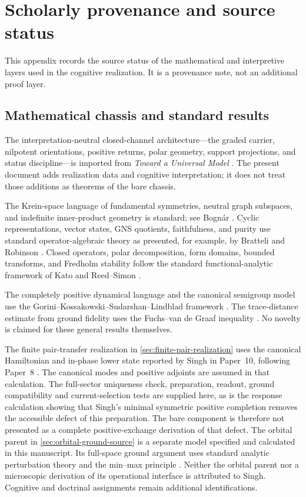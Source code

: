 \documentclass[11pt,reqno]{scrartcl}
\theoremstyle{plain}
\theoremstyle{definition}
\theoremstyle{remark}
\begin{document}
\section{Scholarly provenance and source status}
\label{app:provenance}

This appendix records the source status of the mathematical and interpretive
layers used in the cognitive realization.  It is a provenance note, not an
additional proof layer.

\subsection{Mathematical chassis and standard results}

The interpretation-neutral closed-channel architecture---the graded carrier,
nilpotent orientations, positive returns, polar geometry, support
projections, and status discipline---is imported from \emph{Toward a
Universal Model} \cite{TAUM2026}.  The present document adds realization data
and cognitive interpretation; it does not treat those additions as theorems of
the bare chassis.

The Krein-space language of fundamental symmetries, neutral graph subspaces,
and indefinite inner-product geometry is standard; see Bogn\'ar
\cite{Bognar}.  Cyclic representations, vector states, GNS quotients,
faithfulness, and purity use standard operator-algebraic theory as presented,
for example, by Bratteli and Robinson \cite{BratteliRobinson}.  Closed
operators, polar decomposition, form domains, bounded transforms, and
Fredholm stability follow the standard functional-analytic framework of Kato
and Reed--Simon \cite{Kato,ReedSimon}.

The completely positive dynamical language and the canonical semigroup model
use the Gorini--Kossakowski--Sudarshan--Lindblad framework
\cite{GKS1976,Lindblad1976}.  The trace-distance estimate from ground fidelity
uses the Fuchs--van de Graaf inequality \cite{FuchsVandeGraaf1999}.  No novelty
is claimed for these general results themselves.

The finite pair-transfer realization in \cref{sec:finite-pair-realization}
uses the canonical Hamiltonian and in-phase lower state reported by
Singh in Paper~10, following Paper~8 \cite{Singh2026PairTransfer}.
The canonical modes and positive adjoints are assumed in that calculation.
The full-sector uniqueness check, preparation, readout, ground
compatibility and current-selection tests are supplied here, as is the
response calculation showing that Singh's minimal symmetric positive
completion removes the accessible defect of this preparation.  The bare
component is therefore not presented as a complete positive-exchange
derivation of that defect.
The orbital parent in \cref{sec:orbital-ground-source} is a separate
model specified and calculated in this manuscript.  Its full-space
ground argument uses standard analytic perturbation theory and the
min--max principle \cite{Kato,ReedSimon}.  Neither the orbital parent
nor a microscopic derivation of its operational interface is attributed
to Singh.  Cognitive and doctrinal assignments remain additional
identifications.
\end{document}
